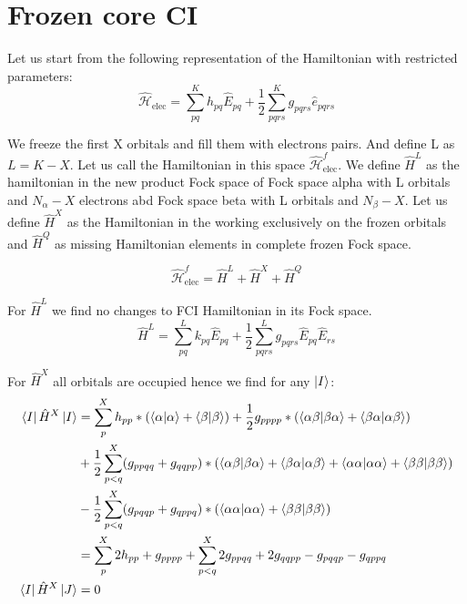 
\section{Frozen core CI}

Let us start from the following representation of the Hamiltonian with restricted parameters:
\begin{equation}\label{eq:ham}
      \hat{\mathcal{H}}_\text{elec} = \sum_{pq}^K h_{pq} \hat{E}_{pq} + \frac{1}{2} \sum_{pqrs}^K g_{pqrs} \hat{e}_{pqrs}
  \end{equation}

We freeze the first X orbitals and fill them with electrons pairs. And define L as $L=K-X$.  Let us call the Hamiltonian in this space $\hat{\mathcal{H}}^{f}_\text{elec}$.
We define $\hat{{H}}^{L}$ as the hamiltonian in the new product Fock space of Fock space alpha with L orbitals and $N_\alpha - X$ electrons abd Fock space beta with L orbitals and $N_\beta - X$. Let us define $\hat{{H}}^{X}$ as the Hamiltonian in the working exclusively on the frozen orbitals and $\hat{{H}}^{Q}$ as missing Hamiltonian elements in complete frozen Fock space.

\begin{equation}
  \hat{\mathcal{H}}^{f}_\text{elec} = \hat{{H}}^{L} + \hat{{H}}^{X} + \hat{{H}}^{Q}
\end{equation}

For $\hat{{H}}^{L}$ we find no changes to FCI Hamiltonian in its Fock space.
\begin{equation}
  \hat{{H}}^{L} = \sum_{pq}^L k_{pq} \hat{E}_{pq} + \frac{1}{2} \sum_{pqrs}^L g_{pqrs} \hat{E}_{pq} \hat{E}_{rs}
\end{equation}

For $\hat{{H}}^{X}$ all orbitals are occupied hence we find for any $\ket{I}$:
\begin{align}
 \bra{I}  \hat{{H}}^{X} \ket{I} &= \sum^{X}_{p}  h_{pp} * (\braket{\alpha}{\alpha} + \braket{\beta}{\beta}) + \frac{1}{2} g_{pppp} * (\braket{\alpha \beta}{\beta \alpha} + \braket{\beta \alpha}{\alpha \beta})  \\
   & +  \frac{1}{2} \sum^{X}_{p<q}  (g_{ppqq} + g_{qqpp}) * (\braket{\alpha \beta}{\beta \alpha} + \braket{\beta \alpha}{\alpha \beta} + \braket{\alpha \alpha}{\alpha \alpha} + \braket{\beta \beta}{\beta \beta}) \\
    & -  \frac{1}{2} \sum^{X}_{p<q} (g_{pqqp} + g_{qppq}) * (\braket{\alpha \alpha}{\alpha \alpha} + \braket{\beta \beta}{\beta \beta}) \\
    & = \sum^{X}_{p} 2 h_{pp} + g_{pppp} + \sum^{X}_{p<q} 2g_{ppqq} + 2g_{qqpp} - g_{pqqp} - g_{qppq} \\
    \bra{I} \hat{{H}}^{X} \ket{J} &= 0
\end{align}


